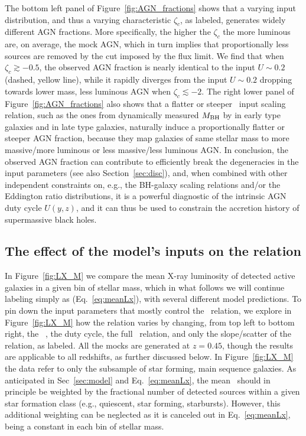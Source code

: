 The bottom left panel of Figure~\ref{fig:AGN_fractions} shows that a varying input \PLz{} distribution, and thus a varying characteristic $\zeta_c$, as labeled, generates widely different AGN fractions. More specifically, the higher the $\zeta_c$ the more luminous are, on average, the mock AGN, which in turn implies that proportionally less sources are removed by the cut imposed by the flux limit. We find that when $\zeta_c \gtrsim -0.5$, the observed AGN fraction is nearly identical to the input $U\sim 0.2$ (dashed, yellow line), while it rapidly diverges from the input $U\sim 0.2$ dropping towards lower mass, less luminous AGN when $\zeta_c \lesssim -2$. The right lower panel of Figure~\ref{fig:AGN_fractions} also shows that a flatter or steeper \MBHMS\ input scaling relation, such as the ones from dynamically measured $M_{\rm BH}$ by \citet[][dotted, turquoise line]{2019ApJ...876..155S} in early type galaxies and \citet[][dot-dashed, magenta line]{2018ApJ...869..113D} in late type galaxies, naturally induce a proportionally flatter or steeper AGN fraction, because they map galaxies of same stellar mass to more massive/more luminous or less massive/less luminous AGN. In conclusion, the observed AGN fraction can contribute to efficiently break the degeneracies in the input parameters (see also Section~\ref{sec:disc}), and, when combined with other independent constraints on, e.g., the BH-galaxy scaling relations and/or the Eddington ratio distributions, it is a powerful diagnostic of the intrinsic AGN duty cycle $U(y,z)$, and it can thus be used to constrain the accretion history of supermassive black holes.


\subsection{The effect of the model's inputs on the \LXMS{} relation} \label{ssec:Fig2}

In Figure~\ref{fig:LX_M} we compare the mean X-ray luminosity of detected active galaxies in a given bin of stellar mass, which in what follows we will continue labeling simply as \LX{} (Eq.~\ref{eq:meanLx}), with several different model predictions. To pin down the input parameters that mostly control the \LXMS\ relation, we explore in Figure~\ref{fig:LX_M} how the relation varies by changing, from top left to bottom right, the \PLz\ , the duty cycle, the full \MBHMS\ relation, and only the slope/scatter of the \citet{2015ApJ...813...82R} relation, as labeled. All the mocks are generated at $z=0.45$, though the results are applicable to all redshifts, as further discussed below. In Figure~\ref{fig:LX_M} the data refer to only the subsample of star forming, main sequence galaxies. As anticipated in Sec~\ref{sec:model} and Eq.~\ref{eq:meanLx}, the mean \LX\ should in principle be weighted by the fractional number of detected sources within a given star formation class (e.g., quiescent, star forming, starbursts). However, this additional weighting can be neglected as it is canceled out in Eq.~\ref{eq:meanLx}, being a constant in each bin of stellar mass.

